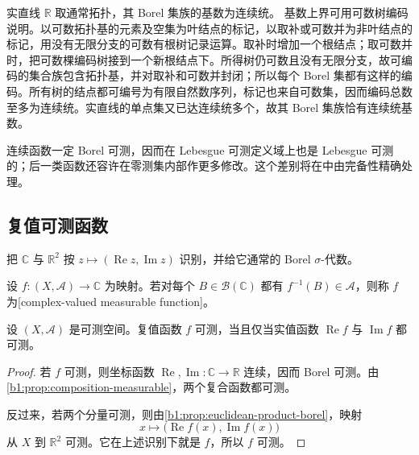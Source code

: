 \begin{remark}
\label{b1:rem:borel-cardinality-coding}
实直线 \(\mathbb R\) 取通常拓扑，其 Borel 集族的基数为连续统。
基数上界可用可数树编码说明。以可数拓扑基的元素及空集为叶结点的标记，以取补或可数并为非叶结点的标记，用没有无限分支的可数有根树记录运算。取补时增加一个根结点；取可数并时，把可数棵编码树接到一个新根结点下。所得树仍可数且没有无限分支，故可编码的集合族包含拓扑基，并对取补和可数并封闭；所以每个 Borel 集都有这样的编码。所有树的结点都可编号为有限自然数序列，标记也来自可数集，因而编码总数至多为连续统。实直线的单点集又已达连续统多个，故其 Borel 集族恰有连续统基数。
\end{remark}

连续函数一定 Borel 可测，因而在 Lebesgue 可测定义域上也是 Lebesgue 可测的；后一类函数还容许在零测集内部作更多修改。这个差别将在中由完备性精确处理。

\subsection{复值可测函数}
\label{b1:subsec:040103}

把 \(\mathbb C\) 与 \(\mathbb R^2\) 按 \(z\mapsto(\operatorname{Re}z,\operatorname{Im}z)\) 识别，并给它通常的 Borel \(\sigma\)-代数。

\begin{definition}
\label{b1:def:complex-measurable-function}
设 \(f:(X,\mathcal A)\rightarrow\mathbb C\) 为映射。若对每个 \(B\in\mathcal B(\mathbb C)\) 都有 \(f^{-1}(B)\in\mathcal A\)，则称 \(f\) 为[complex-valued measurable function]。
\end{definition}

\begin{proposition}
\label{b1:prop:complex-components-measurable}
设 \((X,\mathcal A)\) 是可测空间。复值函数 \(f\) 可测，当且仅当实值函数 \(\operatorname{Re}f\) 与 \(\operatorname{Im}f\) 都可测。
\end{proposition}
\begin{proof}
若 \(f\) 可测，则坐标函数 \(\operatorname{Re},\operatorname{Im}:\mathbb C\rightarrow\mathbb R\) 连续，因而 Borel 可测。由\cref{b1:prop:composition-measurable}，两个复合函数都可测。

反过来，若两个分量可测，则由\cref{b1:prop:euclidean-product-borel}，映射
\[
x\longmapsto
\bigl(\operatorname{Re}f(x),\operatorname{Im}f(x)\bigr)
\]
从 \(X\) 到 \(\mathbb R^2\) 可测。它在上述识别下就是 \(f\)，所以 \(f\) 可测。
\end{proof}

